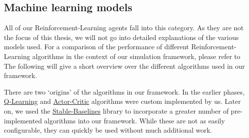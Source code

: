 \subsection*{Machine learning models}\label{subsec:MachineLearningModels}

All of our Reinforcement-Learning agents fall into this category. As they are not the focus of this thesis, we will not go into detailed explanations of the various models used. For a comparison of the performance of different Reinforcement-Learning algorithms in the context of our simulation framework, please refer to~\cite{JanThesis} The following will give a short overview over the different algorithms used in our framework.

There are two `origins' of the algorithms in our framework. In the earlier phases, \hyperref[item:QLearning]{Q-Learning} and \hyperref[item:ActorCritic]{Actor-Critic} algorithms were custom implemented by us. Later on, we used the \hyperref[item:StableBaselines]{Stable-Baselines} library to incorporate a greater number of pre-implemented algorithms into our framework. While these are not as easily configurable, they can quickly be used without much additional work.

